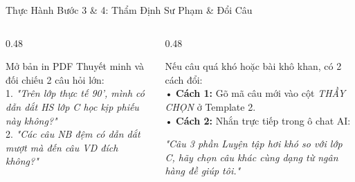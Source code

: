 \documentclass[aspectratio=169,11pt]{beamer}
\begin{document}
\begin{frame}{Thực Hành Bước 3 \& 4: Thẩm Định Sư Phạm \& Đổi Câu}
  \begin{columns}[T]
    \begin{column}{0.48\textwidth}
      \begin{tcolorbox}[accentcard, title=BƯỚC 3: GV Thẩm Định Sư Phạm]
        \scriptsize
        Mở bản in PDF Thuyết minh và đối chiếu 2 câu hỏi lớn:\\[3pt]
        1. \textit{"Trên lớp thực tế 90', mình có dẫn dắt HS lớp C học kịp phiếu này không?"}\\[4pt]
        2. \textit{"Các câu NB đệm có dẫn dắt mượt mà đến câu VD đích không?"}
      \end{tcolorbox}
    \end{column}

    \begin{column}{0.48\textwidth}
      \begin{tcolorbox}[slidecard, title=BƯỚC 4: Đổi Câu Linh Hoạt]
        \scriptsize
        Nếu câu quá khó hoặc bài khô khan, có 2 cách đổi:\\
        • \textbf{Cách 1:} Gõ mã câu mới vào cột \textit{THẦY CHỌN} ở Template 2.\\
        • \textbf{Cách 2:} Nhắn trực tiếp trong ô chat AI:
        \vspace{2pt}
        \begin{tcolorbox}[quotecard]
          \color{brand}\itshape\tiny
          "Câu 3 phần Luyện tập hơi khó so với lớp C, hãy chọn câu khác cùng dạng từ ngân hàng đề giúp tôi."
        \end{tcolorbox}
      \end{tcolorbox}
    \end{column}
  \end{columns}
\end{frame}
\end{document}
